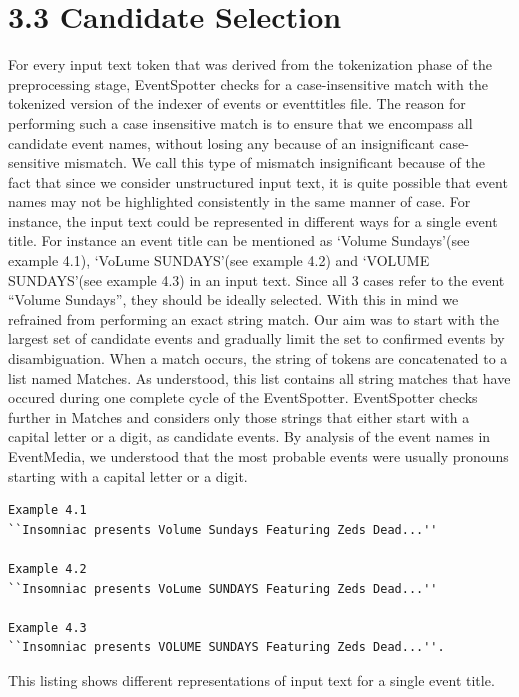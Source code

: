 \documentclass[a4paper,11pt]{report}
\begin{document}

\section*{3.3 Candidate Selection}

For every input text token that was derived from the tokenization phase of the preprocessing stage, EventSpotter checks for a case-insensitive match with the tokenized version of the indexer of events or eventtitles file. The reason for performing such a case insensitive match is to ensure that we encompass all candidate event names, without losing any because of an insignificant case-sensitive mismatch. We call this type of mismatch insignificant because of the fact that since we consider unstructured input text, it is quite possible that event names may not be highlighted consistently in the same manner of case. For instance, the input text could be represented in different ways for a single event title. For instance an event title can be mentioned as `Volume Sundays'(see example 4.1), `VoLume SUNDAYS'(see example 4.2) and `VOLUME SUNDAYS'(see example 4.3) in an input text. Since all 3 cases refer to the event ``Volume Sundays'', they  should be ideally selected. With this in mind we refrained from performing an exact string match. Our aim was to start with the largest set of candidate events and gradually limit the set to confirmed events by disambiguation. When a match occurs, the string of tokens are concatenated to a list named Matches. As understood, this list contains all string matches that have occured during one complete cycle of the EventSpotter. EventSpotter checks further in Matches and considers only those strings that either start with a capital letter or a digit, as candidate events. By analysis of the event names in  EventMedia, we understood that the most probable events were usually pronouns starting with a capital letter or a digit. \newline 

\begin{lstlisting}
Example 4.1
``Insomniac presents Volume Sundays Featuring Zeds Dead...''

Example 4.2
``Insomniac presents VoLume SUNDAYS Featuring Zeds Dead...'' 

Example 4.3
``Insomniac presents VOLUME SUNDAYS Featuring Zeds Dead...''.
\end{lstlisting}
This listing shows different representations of input text for a single event title.
\end{document}
